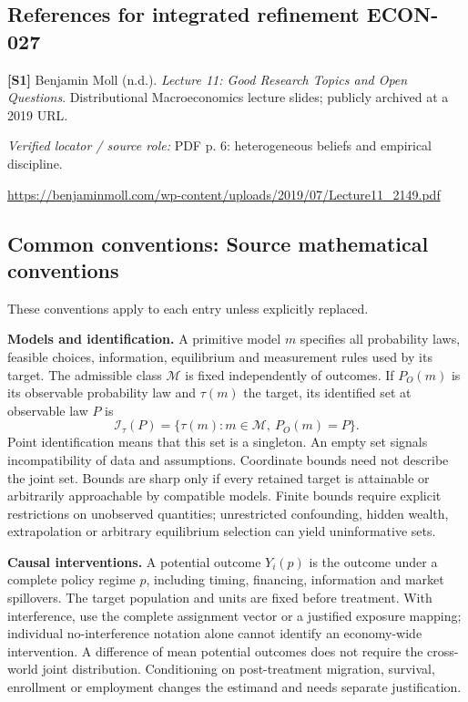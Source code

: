 \documentclass[11pt,a4paper]{article}
\begin{document}
\subsection*{References for integrated refinement ECON-027}
{\footnotesize\raggedright
\par\noindent\textbf{[S1]} Benjamin Moll (n.d.). \emph{Lecture 11: Good Research Topics and Open Questions}. Distributional Macroeconomics lecture slides; publicly archived at a 2019 URL.\par \textit{Verified locator / source role:} PDF p. 6: heterogeneous beliefs and empirical discipline.\par \url{https://benjaminmoll.com/wp-content/uploads/2019/07/Lecture11_2149.pdf}\par\smallskip
}

\subsection*{Common conventions: Source mathematical conventions}

These conventions apply to each entry unless explicitly replaced.

\textbf{Models and identification.} A primitive model \(m\) specifies all probability laws, feasible choices, information, equilibrium and measurement rules used by its target. The admissible class \(\mathcal M\) is fixed independently of outcomes. If \(P_O(m)\) is its observable probability law and \(\tau(m)\) the target, its identified set at observable law \(P\) is
\[
 \mathcal I_\tau(P)=\{\tau(m):m\in\mathcal M,\ P_O(m)=P\}.
\]
Point identification means that this set is a singleton. An empty set signals incompatibility of data and assumptions. Coordinate bounds need not describe the joint set. Bounds are sharp only if every retained target is attainable or arbitrarily approachable by compatible models. Finite bounds require explicit restrictions on unobserved quantities; unrestricted confounding, hidden wealth, extrapolation or arbitrary equilibrium selection can yield uninformative sets.

\textbf{Causal interventions.} A potential outcome \(Y_i(p)\) is the outcome under a complete policy regime \(p\), including timing, financing, information and market spillovers. The target population and units are fixed before treatment. With interference, use the complete assignment vector or a justified exposure mapping; individual no-interference notation alone cannot identify an economy-wide intervention. A difference of mean potential outcomes does not require the cross-world joint distribution. Conditioning on post-treatment migration, survival, enrollment or employment changes the estimand and needs separate justification.
\end{document}
